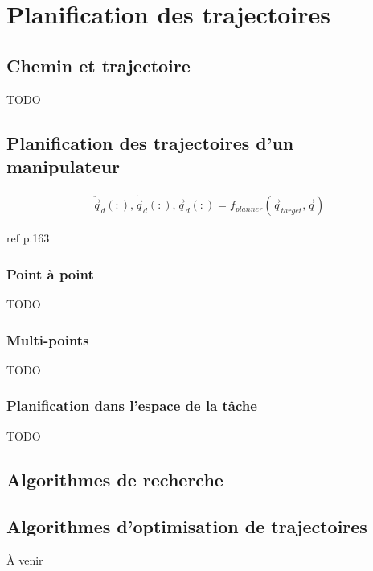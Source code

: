 \chapter{Planification des trajectoires}



\section{Chemin et trajectoire}
TODO

\section{Planification des trajectoires d'un manipulateur}

%
\begin{align}
  \ddot{\vec{q}}_d(:),\dot{\vec{q}}_d(:),\vec{q}_d(:) = f_{planner}(\vec{q}_{target}, \vec{q})
	\label{eq:trajgen}
\end{align}
%

ref p.163

\subsection{Point à point}
TODO

\subsection{Multi-points}
TODO



\subsection{Planification dans l'espace de la tâche}
TODO


\section{Algorithmes de recherche}


\section{Algorithmes d'optimisation de trajectoires}


À venir